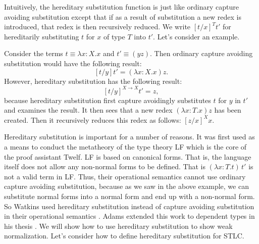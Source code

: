 Intuitively, the hereditary substitution function is just like
ordinary capture avoiding substitution except that if as a result of
substitution a new redex is introduced, that redex is then recursively
reduced.  We write $[t/x]^{T} t'$ for hereditarily substituting $t$ for
$x$ of type $T$ into $t'$.  Let's consider an example.
\begin{example}
  \label{ex:hs}
  Consider the terms $t \equiv \lambda x:X.x$ and $t' \equiv (y z)$.
  Then ordinary capture avoiding substitution would have the following
  result: $$ [t/y]t' = (\lambda x:X.x) z. $$ However, hereditary
  substitution has the following result: $$[t/y]^{X \to X} t' = z,$$
  because hereditary substitution first capture avoidingly substitutes
  $t$ for $y$ in $t'$ and examines the result. It then sees that a new
  redex $(\lambda x:T.x) z$ has been created.  Then it recursively
  reduces this redex as follows: $[z/x]^X x.$
\end{example}
Hereditary substitution is important for a number of reasons.  It was
first used as a means to conduct the metatheory of the type theory LF
which is the core of the proof assistant Twelf.  LF is based on
canonical forms.  That is, the language itself does not allow any
non-normal forms to be defined.  That is $(\lambda x:T.t)\,t'$ is not
a valid term in LF.  Thus, their operational semantics cannot use
ordinary capture avoiding substitution, because as we saw in the above
example, we can substitute normal forms into a normal form and end up
with a non-normal form.  So Watkins used hereditary substitution
instead of capture avoiding substitution in their operational
semantics \cite{Watkins:2004}. Adams extended this work to dependent
types in his thesis \cite{Adams:2004}.  We will show how to use
hereditary substitution to show weak normalization.  Let's consider how
to define hereditary substitution for STLC.

